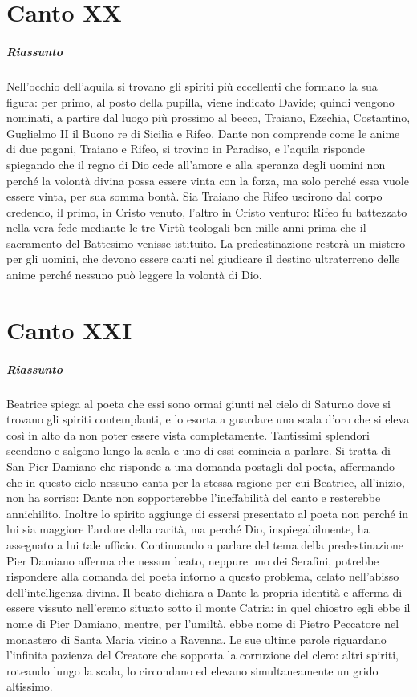 \documentclass[a4paper, twoside, titlepage]{book}
\begin{document}
\chapter{Canto XX}

\paragraph{Riassunto} Nell’occhio dell’aquila si trovano gli spiriti più eccellenti che formano la sua figura: per primo, al posto della pupilla, viene indicato Davide; quindi vengono nominati, a partire dal luogo più prossimo al becco, Traiano, Ezechia, Costantino, Guglielmo II il Buono re di Sicilia e Rifeo. Dante non comprende come le anime di due pagani, Traiano e Rifeo, si trovino in Paradiso, e l’aquila risponde spiegando che il regno di Dio cede all’amore e alla speranza degli uomini non perché la volontà divina possa essere vinta con la forza, ma solo perché essa vuole essere vinta, per sua somma bontà. Sia Traiano che Rifeo uscirono dal corpo credendo, il primo, in Cristo venuto, l’altro in Cristo venturo: Rifeo fu battezzato nella vera fede mediante le tre Virtù teologali ben mille anni prima che il sacramento del Battesimo venisse istituito. La predestinazione resterà un mistero per gli uomini, che devono essere cauti nel giudicare il destino ultraterreno delle anime perché nessuno può leggere la volontà di Dio.

\chapter{Canto XXI}

\paragraph{Riassunto} Beatrice spiega al poeta che essi sono ormai giunti nel cielo di Saturno dove si trovano gli spiriti contemplanti, e lo esorta a guardare una scala d’oro che si eleva così in alto da non poter essere vista completamente. Tantissimi splendori scendono e salgono lungo la scala e uno di essi comincia a parlare. Si tratta di San Pier Damiano che risponde a una domanda postagli dal poeta, affermando che in questo cielo nessuno canta per la stessa ragione per cui Beatrice, all’inizio, non ha sorriso: Dante non sopporterebbe l’ineffabilità del canto e resterebbe annichilito. Inoltre lo spirito aggiunge di essersi presentato al poeta non perché in lui sia maggiore l’ardore della carità, ma perché Dio, inspiegabilmente, ha assegnato a lui tale ufficio. Continuando a parlare del tema della predestinazione Pier Damiano afferma che nessun beato, neppure uno dei Serafini, potrebbe rispondere alla domanda del poeta intorno a questo problema, celato nell’abisso dell’intelligenza divina. Il beato dichiara a Dante la propria identità e afferma di essere vissuto nell’eremo situato sotto il monte Catria: in quel chiostro egli ebbe il nome di Pier Damiano, mentre, per l’umiltà, ebbe nome di Pietro Peccatore nel monastero di Santa Maria vicino a Ravenna. Le sue ultime parole riguardano l’infinita pazienza del Creatore che sopporta la corruzione del clero: altri spiriti, roteando lungo la scala, lo circondano ed elevano simultaneamente un grido altissimo.
\end{document}
